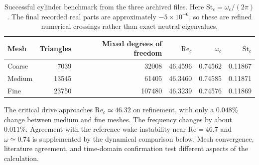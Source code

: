 \begin{table}[htbp]\centering\small
\begin{tabular}{lrrrrr}\toprule
Mesh & Triangles & Mixed degrees of freedom & $\mathrm{Re}_c$ & $\omega_c$ & $\mathrm{St}_c$\\\midrule
Coarse & 7039 & 32008 & 46.4596 & 0.74562 & 0.11867\\
Medium & 13545 & 61405 & 46.3460 & 0.74585 & 0.11871\\
Fine & 23750 & 107480 & 46.3239 & 0.74576 & 0.11869\\\bottomrule
\end{tabular}
\caption[Successful cylinder benchmark]{Successful cylinder benchmark from the three archived  files. Here $\mathrm{St}_c=\omega_c/(2\pi)$. The final recorded real parts are approximately $-5\times10^{-6}$, so these are refined numerical crossings rather than exact neutral eigenvalues.}
\label{tab:cylinder-onset}
\end{table}
The critical drive approaches $\mathrm{Re}_c\simeq46.32$ on refinement, with only a $0.048\%$ change between medium and fine meshes. The frequency changes by about $0.011\%$. Agreement with the reference wake instability near $\mathrm{Re}=46.7$ and $\omega\simeq0.74$ \cite{wake} is supplemented by the dynamical comparison below. Mesh convergence, literature agreement, and time-domain confirmation test different aspects of the calculation.
